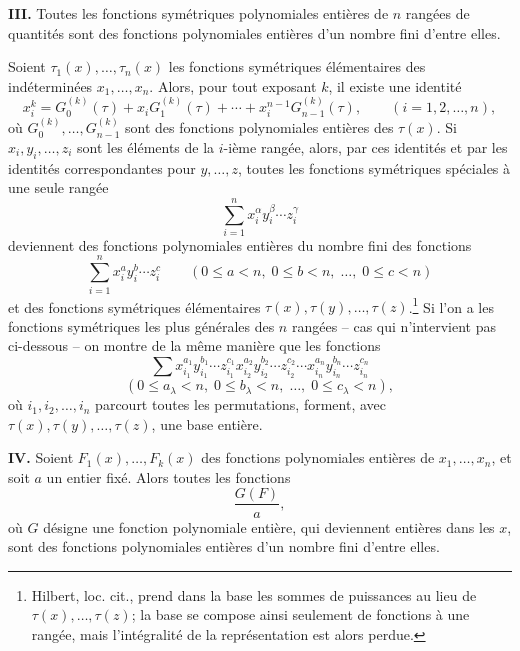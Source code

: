 \textbf{III.} Toutes les fonctions symétriques polynomiales entières de $n$ rangées de quantités sont des fonctions polynomiales entières d'un nombre fini d'entre elles.

Soient $\tau_1(x),\ldots,\tau_n(x)$ les fonctions symétriques élémentaires des indéterminées $x_1,\ldots,x_n$. Alors, pour tout exposant $k$, il existe une identité
\[
        x_i^k = G_0^{(k)}(\tau)+x_iG_1^{(k)}(\tau)+\cdots+x_i^{n-1}G_{n-1}^{(k)}(\tau),
        \qquad (i=1,2,\ldots,n),
\]
où $G_0^{(k)},\ldots,G_{n-1}^{(k)}$ sont des fonctions polynomiales entières des $\tau(x)$. Si $x_i,y_i,\ldots,z_i$ sont les éléments de la $i$-ième rangée, alors, par ces identités et par les identités correspondantes pour $y,\ldots,z$, toutes les fonctions symétriques spéciales à une seule rangée
\[
        \sum_{i=1}^n x_i^{\alpha}y_i^{\beta}\cdots z_i^{\gamma}
\]
deviennent des fonctions polynomiales entières du nombre fini des fonctions
\[
        \sum_{i=1}^n x_i^{a}y_i^{b}\cdots z_i^{c}
        \qquad
        (0\le a<n,\;0\le b<n,\;\ldots,\;0\le c<n)
\]
et des fonctions symétriques élémentaires $\tau(x),\tau(y),\ldots,\tau(z)$.\footnote{Hilbert, loc. cit., prend dans la base les sommes de puissances au lieu de $\tau(x),\ldots,\tau(z)$; la base se compose ainsi seulement de fonctions à une rangée, mais l'intégralité de la représentation est alors perdue.} Si l'on a les fonctions symétriques les plus générales des $n$ rangées -- cas qui n'intervient pas ci-dessous -- on montre de la même manière que les fonctions
\[
        \sum x_{i_1}^{a_1}y_{i_1}^{b_1}\cdots z_{i_1}^{c_1}
              x_{i_2}^{a_2}y_{i_2}^{b_2}\cdots z_{i_2}^{c_2}
              \cdots
              x_{i_n}^{a_n}y_{i_n}^{b_n}\cdots z_{i_n}^{c_n}
\]
\[
        (0\le a_\lambda<n,\;0\le b_\lambda<n,\;\ldots,\;0\le c_\lambda<n),
\]
où $i_1,i_2,\ldots,i_n$ parcourt toutes les permutations, forment, avec $\tau(x),\tau(y),\ldots,\tau(z)$, une base entière.

\textbf{IV.} Soient $F_1(x),\ldots,F_k(x)$ des fonctions polynomiales entières de $x_1,\ldots,x_n$, et soit $a$ un entier fixé. Alors toutes les fonctions
\[
        \frac{G(F)}{a},
\]
où $G$ désigne une fonction polynomiale entière, qui deviennent entières dans les $x$, sont des fonctions polynomiales entières d'un nombre fini d'entre elles.

